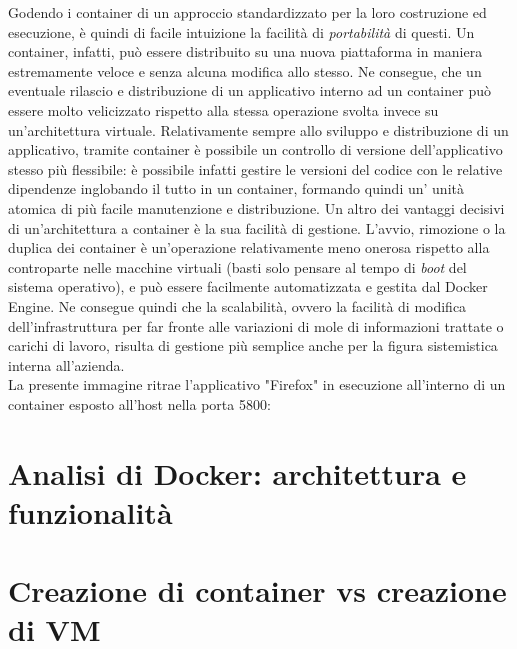 Godendo i container di un approccio standardizzato per la loro costruzione ed esecuzione, è quindi di facile intuizione la facilità di \textit{portabilità} di questi. Un container, infatti, può essere distribuito su una nuova piattaforma in maniera estremamente veloce e senza alcuna modifica allo stesso. Ne consegue, che un eventuale rilascio e distribuzione di un applicativo interno ad un container può essere molto velicizzato rispetto alla stessa operazione svolta invece su un'architettura virtuale. Relativamente sempre allo sviluppo e distribuzione di un applicativo, tramite container è possibile un controllo di versione dell'applicativo stesso più flessibile: è possibile infatti gestire le versioni del codice con le relative dipendenze inglobando il tutto in un container, formando quindi un' unità atomica di più facile manutenzione e distribuzione.
Un altro dei vantaggi decisivi di un'architettura a container è la sua facilità di gestione. L'avvio, rimozione o la duplica dei container è un'operazione relativamente meno onerosa rispetto alla controparte nelle macchine virtuali (basti solo pensare al tempo di \textit{\gls{boot}} del sistema operativo), e può essere facilmente automatizzata e gestita dal Docker Engine. Ne consegue quindi che la scalabilità, ovvero la facilità di modifica dell'infrastruttura per far fronte alle variazioni di mole di informazioni trattate o carichi di lavoro, risulta di gestione più semplice anche per la figura sistemistica interna all'azienda.
\\
La presente immagine ritrae l'applicativo "Firefox" in esecuzione all'interno di un container esposto all'host nella porta 5800:

\section{Analisi di Docker: architettura e funzionalità}



\section{Creazione di container vs creazione di VM}

